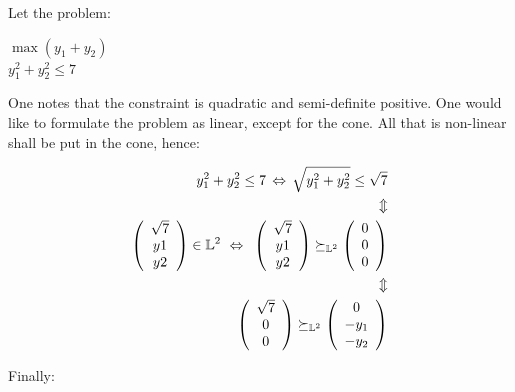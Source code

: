 \begin{example}
\begin{leftbar}
Let the problem:
\begin{center}
$\max (y_1+y_2)$ \\
$y_1^2+y_2^2 \leq 7$
\end{center}

One notes that the constraint is quadratic and semi-definite positive. One would like to formulate the problem as linear, except for the cone. All that is non-linear shall be put in the cone, hence: 

\begin{align*}
y_1^2+y_2^2 \leq 7 \, 
\Leftrightarrow \, 
\sqrt{y_1^2+y_2^2} \leq \sqrt{7} \\ \vspace{0.5cm}
\Updownarrow \\ \vspace{0.5cm}
\left( \begin{array}{c}
\sqrt7 \\
y1\\
y2 \end{array} \right) 
\in \mathbb{L}^2 \
\Leftrightarrow \, 
\
\left( \begin{array}{c}
\sqrt7 \\
y1\\
y2 \end{array} \right) 
\succeq_{ \mathbb{L}^2}
\left( \begin{array}{c}
0\\
0\\
0\\\end{array} \right) \\ \vspace{0.5cm}
\Updownarrow \\ \vspace{0.5cm}
\left( \begin{array}{c}
\sqrt7 \\
0\\
0 \end{array} \right) 
\succeq_{ \mathbb{L}^2}
\left( \begin{array}{c}
0 \\
-y_1\\
-y_2 \end{array} \right) 
\end{align*} 

Finally:


\end{leftbar}
\end{example}
